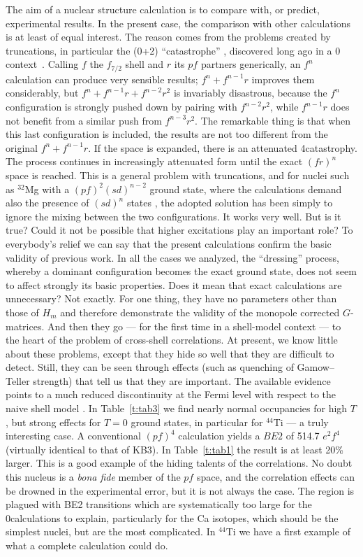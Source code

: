 \begin{multicols}{2}
The aim of a nuclear structure calculation is to compare with, or
predict, experimental results. In the present case, the comparison with
other calculations is at least of equal interest. The reason comes
from the problems created by truncations, in particular the (0+2)\hw
``catastrophe'' \cite{r:wbmb}, discovered long ago in a 0\hw
context~\cite{pasquini}. Calling $f$ the $f_{7/2}$ shell and $r$ its
$pf$ partners generically, an $f^n$ calculation can produce very
sensible results; $f^n+f^{n-1}r$ improves them considerably, but
$f^n+f^{n-1}r+f^{n-2}r^2$ is invariably disastrous, because the $f^n$
configuration is strongly pushed down by pairing with $f^{n-2}r^2$,
while $f^{n-1}r$ does not benefit from a similar push from
$f^{n-3}r^2$. The remarkable thing is that when this last
configuration is included, the results are not too different from the
original $f^n+f^{n-1}r$. If the space is expanded, there is an
attenuated 4\hw catastrophy. The process continues in increasingly
attenuated form until the exact $(fr)^n$ space is reached. This is a
general problem with truncations, and for nuclei such as $^{32}$Mg
with a $(pf)^2(sd)^{n-2}$ ground state, where the calculations demand
also the presence of $(sd)^n$ states , the adopted solution has been
simply to ignore the mixing between the two configurations.  It works
very well. But is it true? Could it not be possible that higher
excitations play an important role? To everybody's relief we can say
that the present calculations confirm the basic validity of previous
work. In all the cases we analyzed, the ``dressing'' process, whereby
a dominant configuration becomes the exact ground state, does not seem
to affect strongly its basic properties. Does it mean that exact
calculations are unnecessary? Not exactly. For one thing, they have no
parameters other than those of $H_m$ and therefore demonstrate the
validity of the monopole corrected $G$-matrices. And then they
go --- for the first time in a shell-model context --- to the heart of the
problem
of cross-shell correlations.  At present, we know little about these
problems,
except that they hide so well that they are difficult to detect.
Still, they can be seen
through effects (such as quenching of Gamow--Teller
strength) that tell us that they are important. The available
evidence points to a much reduced discontinuity at the Fermi level
with respect to the naive shell model \cite{PA84,BE93,CPZ95}. In
Table~\ref{t:tab3} we find nearly normal occupancies for high $T$, but
strong effects for $T=0$ ground states, in particular for $^{44}$Ti --- a
truly interesting case. A conventional $(pf)^4$ calculation yields a
$BE2$ of 514.7 $e^2f^4$ (virtually identical to that of KB3). In
Table~\ref{t:tab1} the result is at least 20\% larger. This is a good
example of the hiding talents of the correlations. No doubt this
nucleus is a {\it bona fide} member of the $pf$ space, and the
correlation effects can be drowned in the experimental error, but it
is not always the case. The region is plagued with BE2 transitions which are
 systematically too large for the 0\hw calculations to explain, particularly
for the Ca isotopes, which should be the simplest nuclei, but are the
most complicated.
In $^{44}$Ti we have a first example of what
a complete calculation could do.


\end{multicols}

